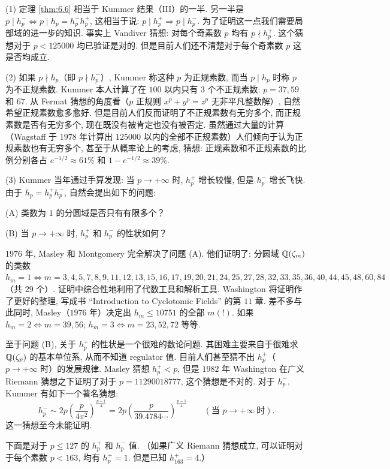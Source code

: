 \begin{remark}
(1) 定理 \ref{thm:6.6} 相当于 Kummer 结果（III）的一半. 另一半是 $p\mid h_p^-\Leftrightarrow p\mid h_p=h_p^-h_p^+$, 这相当于说: $p\mid h_p^+\Rightarrow p\mid h_p^-$. 为了证明这一点我们需要局部域的进一步的知识. 事实上 Vandiver 猜想: 对每个奇素数 $p$ 均有 $p\nmid h_p^+$. 这个猜想对于 $p<125000$ 均已验证是对的. 但是目前人们还不清楚对于每个奇素数 $p$ 这是否均成立.

(2) 如果 $p\nmid h_p$（即 $p\nmid h_p^-$）, Kummer 称这种 $p$ 为正规素数, 而当 $p\mid h_p$ 时称 $p$ 为不正规素数. Kummer 本人计算了在 $100$ 以内只有 $3$ 个不正规素数: $p=37,59$ 和 $67$. 从 Fermat 猜想的角度看（$p$ 正规则 $x^p+y^p=z^p$ 无非平凡整数解）, 自然希望正规素数愈多愈好. 但是目前人们反而证明了不正规素数有无穷多个, 而正规素数是否有无穷多个, 现在既没有被肯定也没有被否定. 虽然通过大量的计算（Wagstaff 于 $1978$ 年计算出 $125000$ 以内的全部不正规素数）人们倾向于认为正规素数也有无穷多个, 甚至于从概率论上的考虑, 猜想: 正规素数和不正规素数的比例分别各占 $e^{-1/2}\approx 61\%$ 和 $1-e^{-1/2}\approx 39\%$.

(3) Kummer 当年通过手算发现: 当 $p\to+\infty$ 时, $h_p^+$ 增长较慢, 但是 $h_p^-$ 增长飞快. 由于 $h_p=h_p^+h_p^-$, 自然会提出如下的问题:

(A) 类数为 $1$ 的分圆域是否只有有限多个？

(B) 当 $p\to+\infty$ 时, $h_p^+$ 和 $h_p^-$ 的性状如何？

$1976$ 年, Masley 和 Montgomery 完全解决了问题 (A). 他们证明了: 分圆域 $\mathbb{Q}(\zeta_m)$ 的类数 $h_m=1\Leftrightarrow m=3,4,5,7,8,9,11,12,13,15,16,17,19,20,21,24,25,27,28,32,33,35,36,40,44,45,48,60,84$（共 $29$ 个）. 证明中综合性地利用了代数工具和解析工具. Washington 将证明作了更好的整理, 写成书 ``Introduction to Cyclotomic Fields'' 的第 $11$ 章. 差不多与此同时, Masley（$1976$ 年）决定出 $h_m\leqslant 10751$ 的全部 $m(!)$. 如果 $h_m=2\Leftrightarrow m=39,56$; $h_m=3\Leftrightarrow m=23,52,72$ 等等.

至于问题 (B), 关于 $h_p^+$ 的性状是一个很难的数论问题. 其困难主要来自于很难求 $\mathbb{Q}(\zeta_p)$ 的基本单位系, 从而不知道 regulator 值. 目前人们甚至猜不出 $h_p^+$（$p\to+\infty$ 时）的发展规律. Masley 猜想 $h_p^+<p$, 但是 $1982$ 年 Washington 在广义 Riemann 猜想之下证明了对于 $p=11290018777$, 这个猜想是不对的. 对于 $h_p^-$, Kummer 有如下一个著名猜想:
\[
  h_p^-\sim 2p\left(\frac{p}{4\pi^2}\right)^{\frac{p-1}{4}}=2p\left(\frac{p}{39.4784\cdots}\right)^{\frac{p-1}{4}}\qquad(\text{当 } p\to+\infty\ \text{时}).
\]
这一猜想至今未能证明.

下面是对于 $p\leqslant 127$ 的 $h_p^+$ 和 $h_p^-$ 值. （如果广义 Riemann 猜想成立, 可以证明对于每个素数 $p<163$, 均有 $h_p^+=1$. 但是已知 $h_{163}^+=4$.）


\end{remark}
